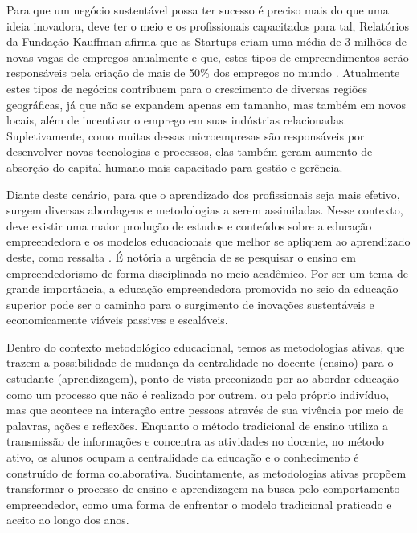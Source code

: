 Para que um negócio sustentável possa ter sucesso é preciso mais do que uma ideia inovadora, deve ter o meio e os profissionais capacitados para tal, Relatórios da Fundação Kauffman afirma que as Startups criam uma média de 3 milhões de novas vagas de empregos anualmente e que, estes tipos de empreendimentos serão responsáveis pela criação de mais de 50\% dos empregos no  mundo  \cite{brasil_o_2017}. Atualmente estes tipos de  negócios contribuem para o crescimento de diversas regiões geográficas, já que não se expandem apenas em tamanho, mas também em novos locais, além de incentivar o emprego em suas indústrias relacionadas. Supletivamente, como muitas dessas microempresas são responsáveis por desenvolver novas tecnologias e processos, elas também geram aumento de absorção do capital humano mais capacitado para gestão e gerência.

Diante deste cenário, para que o aprendizado dos profissionais seja mais efetivo, surgem diversas abordagens e metodologias a serem assimiladas. Nesse contexto, deve existir uma maior produção de estudos e conteúdos sobre a educação empreendedora e os modelos educacionais que melhor se apliquem ao aprendizado deste, como ressalta . É notória a urgência de se pesquisar o ensino em empreendedorismo de forma disciplinada no meio acadêmico. Por ser um tema de grande importância, a educação empreendedora promovida no seio da educação superior pode ser o caminho para o surgimento de inovações sustentáveis e economicamente viáveis passives e escaláveis.

Dentro do contexto metodológico educacional, temos as metodologias ativas, que trazem a possibilidade de mudança da centralidade no docente (ensino) para o estudante (aprendizagem), ponto de vista preconizado por  ao abordar educação como um processo que não é realizado por outrem, ou pelo próprio indivíduo, mas que acontece na interação entre pessoas através de sua vivência por meio de palavras, ações e reflexões. Enquanto o método tradicional de ensino utiliza a transmissão de informações e concentra as atividades no docente, no método ativo, os alunos ocupam a centralidade da educação e o conhecimento é construído de forma colaborativa. Sucintamente, as metodologias ativas propõem transformar o processo de ensino e aprendizagem na busca pelo comportamento empreendedor, como uma forma de enfrentar o modelo tradicional praticado e aceito ao longo dos anos.
 
